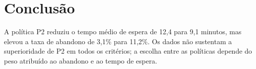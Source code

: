 \section{Conclusão}
A política P2 reduziu o tempo médio de espera de 12,4 para 9,1 minutos, mas elevou a taxa de abandono de 3,1\% para 11,2\%.
Os dados não sustentam a superioridade de P2 em todos os critérios; a escolha entre as políticas depende do peso atribuído ao abandono e ao tempo de espera.

